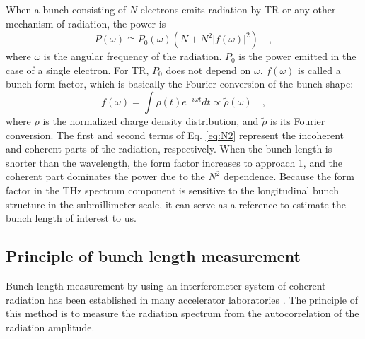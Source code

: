 \documentclass[review]{elsarticle}
\begin{document}
When a bunch consisting of $N$ electrons emits radiation
by TR or any other mechanism of radiation,
the power is 
\begin{equation}
P(\omega) \cong P_0(\omega) (N + N^2 |f(\omega)|^2)
\quad ,
\label{eq:N2}
\end{equation}
where $\omega$ is the angular frequency of the radiation.
$P_0$ is the power emitted in the case of a single electron.
For TR, $P_0$ does not depend on $\omega$.
$f(\omega)$ is called a bunch form factor,
which is basically the Fourier conversion of the bunch shape:
\begin{equation}
f(\omega) =  \int \rho(t) e^{-i\omega t} dt  \propto \tilde{\rho}(\omega) \quad ,
\end{equation}
where $\rho$ is the normalized charge density distribution,
and $\tilde{\rho}$ is its Fourier conversion.
The first and second terms of Eq. \ref{eq:N2}
represent the incoherent and coherent parts of the radiation, respectively.
When the 
bunch length is shorter than the wavelength,
the form factor increases to approach 1,
and the coherent part dominates the power
due to the $N^2$ dependence.
Because the form factor in the THz spectrum component 
is sensitive to the longitudinal bunch structure in the submillimeter scale,
it can serve as a reference to estimate the bunch length of interest to us.





\subsection{Principle of bunch length measurement}
\label{sec:principlebunchlength}

Bunch length measurement
by using an interferometer system of coherent radiation
has been established in many accelerator laboratories \cite{Kung}\cite{Murokh}\cite{Zhang}\cite{Noz}.
The principle of this method is to measure
the radiation spectrum
from the autocorrelation of the radiation amplitude.
\end{document}
